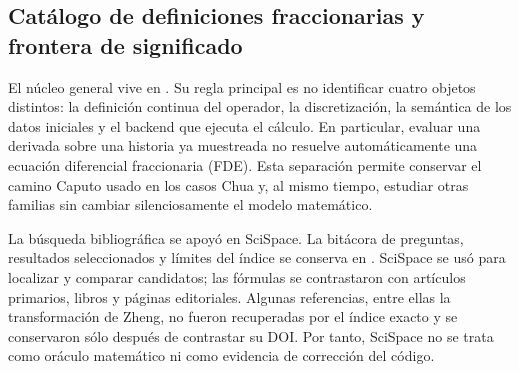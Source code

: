 \subsection{Catálogo de definiciones fraccionarias y frontera de significado}
\label{sec:fundamentos-fraccionarios-diversos}

El núcleo general vive en . Su regla
principal es no identificar cuatro objetos distintos: la definición continua
del operador, la discretización, la semántica de los datos iniciales y el
backend que ejecuta el cálculo. En particular, evaluar una derivada sobre una
historia ya muestreada no resuelve automáticamente una ecuación diferencial
fraccionaria (FDE). Esta separación permite conservar el camino Caputo usado en
los casos Chua y, al mismo tiempo, estudiar otras familias sin cambiar
silenciosamente el modelo matemático.

La búsqueda bibliográfica se apoyó en SciSpace. La bitácora de preguntas,
resultados seleccionados y límites del índice se conserva en
. SciSpace se usó para
localizar y comparar candidatos; las fórmulas se contrastaron con artículos
primarios, libros y páginas editoriales. Algunas referencias, entre ellas la
transformación de Zheng, no fueron recuperadas por el índice exacto y se
conservaron sólo después de contrastar su DOI. Por tanto, SciSpace no se trata
como oráculo matemático ni como evidencia de corrección del código.

